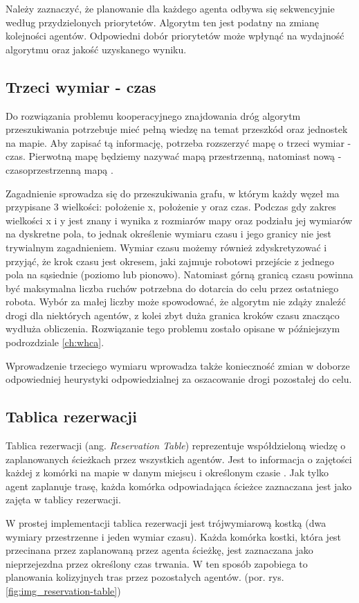 Należy zaznaczyć, że planowanie dla każdego agenta odbywa się sekwencyjnie według przydzielonych priorytetów.
Algorytm ten jest podatny na zmianę kolejności agentów. Odpowiedni dobór priorytetów może wpłynąć na wydajność algorytmu oraz jakość uzyskanego wyniku.

\subsection{Trzeci wymiar - czas}
Do rozwiązania problemu kooperacyjnego znajdowania dróg algorytm przeszukiwania potrzebuje mieć pełną wiedzę na temat przeszkód oraz jednostek na mapie.
Aby zapisać tą informację, potrzeba rozszerzyć mapę o trzeci wymiar - czas. 
Pierwotną mapę będziemy nazywać mapą przestrzenną, natomiast nową - czasoprzestrzenną mapą \cite{cooppath}.

Zagadnienie sprowadza się do przeszukiwania grafu, w którym każdy węzeł ma przypisane 3 wielkości: położenie x, położenie y oraz czas.
Podczas gdy zakres wielkości x i y jest znany i wynika z rozmiarów mapy oraz podziału jej wymiarów na dyskretne pola, to jednak określenie wymiaru czasu i jego granicy nie jest trywialnym zagadnieniem.
Wymiar czasu możemy również zdyskretyzować i przyjąć, że krok czasu jest okresem, jaki zajmuje robotowi przejście z jednego pola na sąsiednie (poziomo lub pionowo). Natomiast górną granicą czasu powinna być maksymalna liczba ruchów potrzebna do dotarcia do celu przez ostatniego robota. Wybór za małej liczby może spowodować, że algorytm nie zdąży znaleźć drogi dla niektórych agentów, z kolei zbyt duża granica kroków czasu znacząco wydłuża obliczenia. Rozwiązanie tego problemu zostało opisane w późniejszym podrozdziale \ref{ch:whca}.

Wprowadzenie trzeciego wymiaru wprowadza także konieczność zmian w doborze odpowiedniej heurystyki odpowiedzialnej za oszacowanie drogi pozostałej do celu.

\subsection{Tablica rezerwacji}
Tablica rezerwacji (ang. {\it Reservation Table}) reprezentuje współdzieloną wiedzę o zaplanowanych ścieżkach przez wszystkich agentów.
Jest to informacja o zajętości każdej z komórki na mapie w danym miejscu i określonym czasie \cite{cooppath}.
Jak tylko agent zaplanuje trasę, każda komórka odpowiadająca ścieżce zaznaczana jest jako zajęta w tablicy rezerwacji.

W prostej implementacji tablica rezerwacji jest trójwymiarową kostką (dwa wymiary przestrzenne i jeden wymiar czasu).
Każda komórka kostki, która jest przecinana przez zaplanowaną przez agenta ścieżkę, jest zaznaczana jako nieprzejezdna przez określony czas trwania. W ten sposób zapobiega to planowania kolizyjnych tras przez pozostałych agentów. (por. rys. \ref{fig:img_reservation-table})

